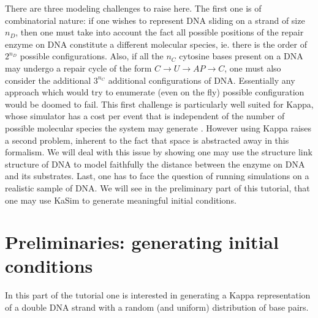 \documentclass[11pt]{article}
\begin{document}
There are three modeling challenges to raise here. The first one is of combinatorial nature: if one wishes to represent DNA sliding on a strand of size $n_D$, then one must take into account the fact all possible positions of the repair enzyme on DNA constitute a different molecular species, ie. there is the order of $2^{n_D}$ possible configurations. Also, if all the $n_C$ cytosine bases present on a DNA  may undergo a repair cycle of the form $C\rightarrow U\rightarrow AP\rightarrow C$, one must also consider the additional $3^{n_C}$ additional configurations of DNA. Essentially any approach which would try to enumerate (even on the fly) possible configuration would be doomed to fail. This first challenge is particularly well suited for Kappa, whose simulator has a cost per event that is independent of the number of possible molecular species the system may generate \cite{Dan_etal07b}. However using Kappa raises a second problem, inherent to the fact that space is abstracted away in this formalism. We will deal with this issue by showing one may use the structure link structure of DNA to model faithfully the distance between the enzyme on DNA and its substrates. Last, one has to face the question of running simulations on a realistic sample of DNA. We will see in the preliminary part of this tutorial, that one may use KaSim to generate meaningful initial conditions. 

\section{Preliminaries: generating initial conditions}

In this part of the tutorial one is interested in generating a Kappa representation of a double DNA strand with a random (and uniform) distribution of base pairs. 
\end{document}
